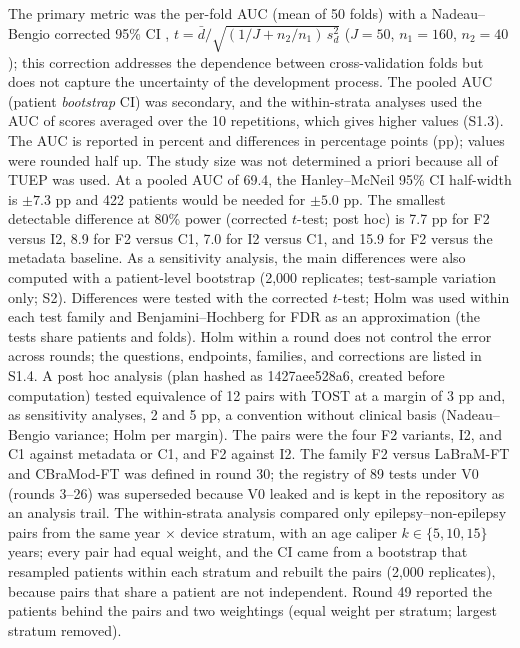 The primary metric was the per-fold AUC (mean of 50 folds) with a Nadeau--Bengio corrected 95\% CI \cite{nadeau2003}, $t=\bar{d}/\sqrt{(1/J+n_{2}/n_{1})\,s_{d}^{2}}$ ($J=50$, $n_{1}=160$, $n_{2}=40$); this correction addresses the dependence between cross-validation folds but does not capture the uncertainty of the development process. The pooled AUC (patient \textit{bootstrap} CI) was secondary, and the within-strata analyses used the AUC of scores averaged over the 10 repetitions, which gives higher values (S1.3). The AUC is reported in percent and differences in percentage points (pp); values were rounded half up. The study size was not determined a priori because all of TUEP was used. At a pooled AUC of 69.4, the Hanley--McNeil 95\% CI half-width is $\pm 7.3$ pp and 422 patients would be needed for $\pm 5.0$ pp. The smallest detectable difference at 80\% power (corrected $t$-test; post hoc) is 7.7 pp for F2 versus I2, 8.9 for F2 versus C1, 7.0 for I2 versus C1, and 15.9 for F2 versus the metadata baseline.
As a sensitivity analysis, the main differences were also computed with a patient-level bootstrap (2,000 replicates; test-sample variation only; S2). Differences were tested with the corrected $t$-test; Holm \cite{holm1979} was used within each test family and Benjamini--Hochberg \cite{bh1995} for FDR as an approximation (the tests share patients and folds). Holm within a round does not control the error across rounds; the questions, endpoints, families, and corrections are listed in S1.4. A post hoc analysis (plan hashed as 1427aee528a6, created before computation) tested equivalence of 12 pairs with TOST at a margin of 3 pp and, as sensitivity analyses, 2 and 5 pp, a convention without clinical basis (Nadeau--Bengio variance; Holm per margin). The pairs were the four F2 variants, I2, and C1 against metadata or C1, and F2 against I2.
The family F2 versus LaBraM-FT and CBraMod-FT was defined in round 30; the registry of 89 tests under V0 (rounds 3--26) was superseded because V0 leaked and is kept in the repository as an analysis trail.
The within-strata analysis compared only epilepsy--non-epilepsy pairs from the same year $\times$ device stratum, with an age caliper $k\in\{5,10,15\}$ years; every pair had equal weight, and the CI came from a bootstrap that resampled patients within each stratum and rebuilt the pairs (2,000 replicates), because pairs that share a patient are not independent. Round 49 reported the patients behind the pairs and two weightings (equal weight per stratum; largest stratum removed).

